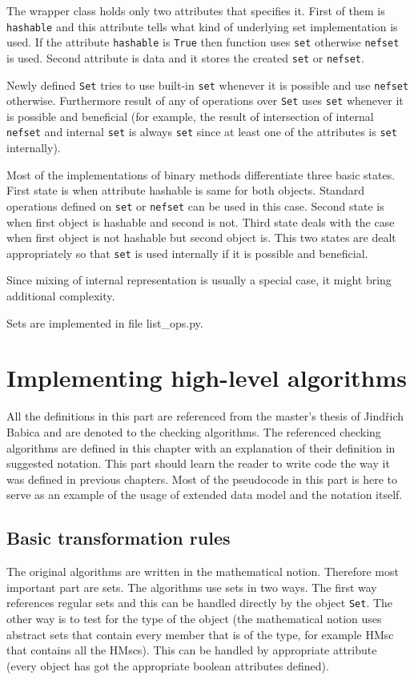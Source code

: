 \documentclass[11pt,oneside]{fithesis2}
\newcommand{\T}[1]{\texttt{#1}}
\begin{document}
The wrapper class holds only two attributes that specifies it. First of them is \T{hashable} and this attribute tells what kind of underlying set implementation is used. If the attribute \T{hashable} is \T{True} then function uses \T{set} otherwise \T{nefset} is used. Second attribute is data and it stores the created \T{set} or \T{nefset}.

Newly defined \T{Set} tries to use built-in \T{set} whenever it is possible and use \T{nefset} otherwise. Furthermore result of any of operations over \T{Set} uses \T{set} whenever it is possible and beneficial (for example, the result of intersection of internal \T{nefset} and internal \T{set} is always \T{set} since at least one of the attributes is \T{set} internally).

Most of the implementations of binary methods differentiate three basic states. First state is when attribute hashable is same for both objects. Standard operations defined on \T{set} or \T{nefset} can be used in this case. Second state is when first object is hashable and second is not. Third state deals with the case when first object is not hashable but second object is. This two states are dealt appropriately so that \T{set} is used internally if it is possible and beneficial.

Since mixing of internal representation is usually a special case, it might bring additional complexity.

Sets are implemented in file list\_ops.py.


\chapter{Implementing high-level algorithms}
All the definitions in this part are referenced from the master's thesis of Jindřich Babica\cite{babica} and are denoted to the checking algorithms. The referenced checking algorithms are defined in this chapter with an explanation of their definition in suggested notation. This part should learn the reader to write code the way it was defined in previous chapters. Most of the pseudocode in this part is here to serve as an example of the usage of extended data model and the notation itself.

\section{Basic transformation rules}
The original algorithms are written in the mathematical notion. Therefore most important part are sets. The algorithms use sets in two ways. The first way references regular sets and this can be handled directly by the object \T{Set}. The other way is to test for the type of the object (the mathematical notion uses abstract sets that contain every member that is of the type, for example HMsc that contains all the HMscs). This can be handled by appropriate attribute (every object has got the appropriate boolean attributes defined).
\end{document}
